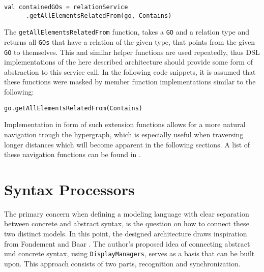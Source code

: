 \begin{lstlisting}[language=customLang, caption={Example on how to get all \texttt{GOs} contained by a given element \texttt{go}, in the \textsc{CouchEdit} architecture}, captionpos=b]
val containedGOs = relationService
      .getAllElementsRelatedFrom(go, Contains) 
\end{lstlisting}

The \texttt{getAllElementsRelatedFrom} function, takes a \texttt{GO} and a relation type and returns all \texttt{GOs} that have a relation of the given type, that points from the given \texttt{GO} to themselves. This and similar helper functions are used repeatedly, thus DSL implementations of the here described architecture should provide some form of abstraction to this service call. In the following code snippets, it is assumed that these functions were masked by member function implementations similar to the following:

\begin{lstlisting}[caption={The \texttt{getAllElementsRelatedFrom} function, implemented as a member function eases navigation through the hypergraph}, captionpos=b]
go.getAllElementsRelatedFrom(Contains)
\end{lstlisting}

Implementation in form of such extension functions allows for a more natural navigation trough the hypergraph, which is especially useful when traversing longer distances which will become apparent in the following sections. A list of these navigation functions can be found in .


\section{Syntax Processors}
The primary concern when defining a modeling language with clear separation between concrete and abstract syntax, is the question on how to connect these two distinct models. In this point, the designed architecture draws inspiration from Fondement and Baar \cite{fondement_making_2005}. The author's proposed idea of connecting abstract und concrete syntax, using \texttt{DisplayManagers}, serves as a basis that can be built upon. This approach consists of two parts, recognition and synchronization.

